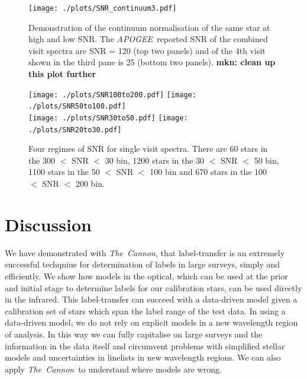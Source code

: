 \documentclass[12pt, preprint]{aastex}
\newcommand{\teff}{\mbox{$\rm T_{eff}$}}
\newcommand{\logg}{\mbox{$\rm \log g$}}
\newcommand{\tc}{\textsl{The~Cannon}}
\newcommand{\apogee}{\textsl{APOGEE}}
\begin{document}
 \begin{figure}[!h]
  \texttt{[image: ./plots/SNR\_continuum3.pdf]}
  \caption{Demonstration of the continuum normalisation of the same star at high and low SNR. The \apogee\ reported SNR of the combined visit spectra are SNR = 120 (top two panels) and of the 4th visit shown in the third pane is 25 (bottom two panels). \textbf{mkn: clean up this plot further} }
\label{fig:lowsnr}
\end{figure}

 \begin{figure}[!h]
 \centering
 \texttt{[image: ./plots/SNR100to200.pdf]}
\texttt{[image: ./plots/SNR50to100.pdf]}\\
\texttt{[image: ./plots/SNR30to50.pdf]}
\texttt{[image: ./plots/SNR20to30.pdf]}
    \caption{Four regimes of SNR for single visit spectra. There are 60 stars in the 300 $<$  SNR $<$ 30 bin, 1200 stars in the 30 $<$ SNR $<$ 50 bin, 1100 stars in the 50 $<$ SNR $<$ 100 bin and 670 stars in the 100 $<$  SNR $<$ 200 bin.}
\label{fig:SNR}
\end{figure}



\section{Discussion}

We have demonstrated with \tc,  that label-transfer is an extremely successful techqniue for determination of labels in large surveys, simply and efficiently. We show how models in the optical, which can be used at the prior and initial stage to determine labels for our calibration stars, can be used directly in the infrared. This label-transfer can succeed with a data-driven model given a calibration set of stars which span the label range of the test data. In using a data-driven model, we do not rely on explicit models in a new wavelength region of analysis. In this way we can fully capitalise on large surveys and the information in the data itself and circumvent problems with simplified stellar models and uncertainties in linelists in new wavelength regions. We can also apply \tc\ to understand where models are wrong.  

\end{document}
